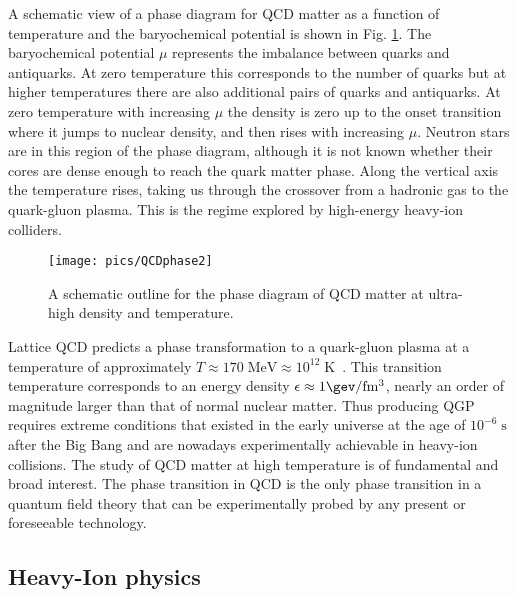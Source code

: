 A schematic view of a phase diagram for QCD matter as a function of temperature and the baryochemical potential is shown in Fig. \ref{fig:QCDphase}. The baryochemical potential $\mu$ represents the imbalance between quarks and antiquarks. At zero temperature this corresponds to the number of quarks but at higher temperatures there are also additional pairs of quarks and antiquarks. At zero temperature with increasing $\mu$ the density is zero up to the onset transition where it jumps to nuclear density, and then rises with increasing $\mu$.  Neutron stars are in this region of the phase diagram, although it is not known whether their cores are dense enough to reach the quark matter phase. Along the vertical axis the temperature rises, taking us through the crossover from a hadronic gas to the quark-gluon plasma. This is the regime explored by high-energy heavy-ion colliders.

\begin{figure}[htbp]
\centering
\texttt{[image: pics/QCDphase2]}
\caption[QCD phase diagram]{A schematic outline for the phase diagram of QCD matter at ultra-high density and temperature.~\cite{Rajagopal:2001}}
\label{fig:QCDphase}
\end{figure}

Lattice QCD predicts a phase transformation to a quark-gluon plasma at a temperature of approximately $T \approx 170 \;\mathrm{MeV} \approx 10^{12} \;\mathrm{K}$~\cite{Adcox:2004mh}.  This transition temperature corresponds to an energy density $\epsilon \approx 1\gev/\mathrm{fm^3}$, nearly an order of magnitude larger than that of normal nuclear matter. Thus producing QGP requires extreme conditions that existed in the early universe at the age of $10^{-6}\;\mathrm{s}$ after the Big Bang and are nowadays experimentally achievable in heavy-ion collisions. The study of QCD matter at high temperature is of fundamental and broad interest. The phase transition in QCD is the only phase transition in a quantum field theory that can be experimentally probed by any present or foreseeable technology. 



 



\FloatBarrier
\pagebreak
\subsection{Heavy-Ion physics}


